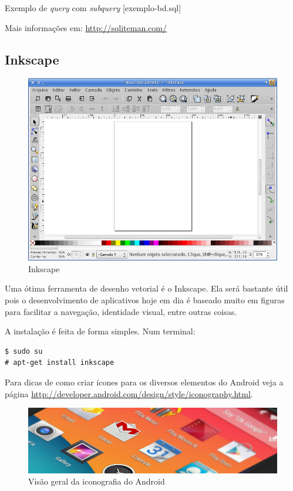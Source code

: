 \begin{listing}[H]
  \inputminted[linenos=true,frame=bottomline,tabsize=3]{ sql }{ source/exemplo-bd-2.sql }
  \caption{Exemplo de \textit{query} com \textit{subquery} [exemplo-bd.sql]}
\end{listing}

Mais informações em: \url{http://sqliteman.com/}

\subsection{Inkscape}

\begin{figure}[h]
\centering
\includegraphics[scale=0.45]{img/preparando-ambiente/inkscape.png}
\caption{Inkscape}
\end{figure}

Uma ótima ferramenta de desenho vetorial é o Inkscape. Ela será bastante
útil pois o desenvolvimento de aplicativos hoje em dia é baseado muito
em figuras para facilitar a navegação, identidade visual, entre outras
coisas.

A instalação é feita de forma simples. Num terminal:

\begin{verbatim}
$ sudo su
# apt-get install inkscape
\end{verbatim}
Para dicas de como criar ícones para os diversos elementos do Android
veja a página
\url{http://developer.android.com/design/style/iconography.html}.

\begin{figure}[h]
    \includegraphics[scale=0.5]{img/preparando-ambiente/iconography-overview.png}
    \caption{Visão geral da iconografia do Android}
\end{figure}
